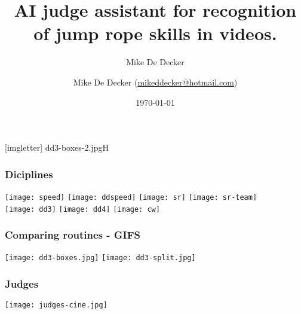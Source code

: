 \documentclass[aspectratio=169]{beamer}
\title[AI Judge]{AI judge assistant for recognition of jump rope skills in videos.}
\author{Mike De Decker}
\author[MDD]{Mike {De Decker} (\href{mailto:mikeddecker@hotmail.com}
    {mikeddecker@hotmail.com})}
\date{\today}
\begin{document}

{
[imgletter]
    {dd3-boxes-2.jpg}{H}

\begin{frame}
    \maketitle
\end{frame}
}


\begin{frame}
  \frametitle{Diciplines}

  \hspace{0.1cm}\texttt{[image: speed]}
  \hspace{0.1cm}\texttt{[image: ddspeed]}
  \hspace{0.1cm}\texttt{[image: sr]}
  \hspace{0.1cm}\texttt{[image: sr-team]} \\
  \vspace{0.1cm}
  \hspace{0.1cm}\texttt{[image: dd3]}
  \hspace{0.1cm}\texttt{[image: dd4]}
  \hspace{0.1cm}\texttt{[image: cw]}

\end{frame}

\begin{frame}
  \frametitle{Comparing routines - GIFS}

  \texttt{[image: dd3-boxes.jpg]}
  \texttt{[image: dd3-split.jpg]}

\end{frame}

\begin{frame}
  \frametitle{Judges}

  \texttt{[image: judges-cine.jpg]}
\end{frame}
\end{document}
